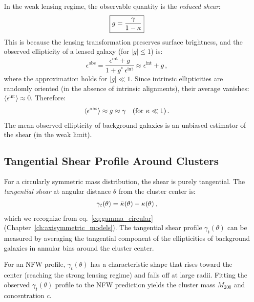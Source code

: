 In the weak lensing regime, the observable quantity is the
\emph{reduced shear}:
\begin{equation}
    \boxed{
    g = \frac{\gamma}{1 - \kappa}
    }
    \label{eq:reduced_shear}
\end{equation}
This is because the lensing transformation preserves surface
brightness, and the observed ellipticity of a lensed galaxy (for
$|g| \leq 1$) is:
\begin{equation}
    \epsilon^{\mathrm{obs}} = \frac{\epsilon^{\mathrm{int}} + g}
    {1 + g^*\, \epsilon^{\mathrm{int}}}
    \approx \epsilon^{\mathrm{int}} + g \,,
    \label{eq:observed_ellipticity}
\end{equation}
where the approximation holds for $|g| \ll 1$.  Since intrinsic
ellipticities are randomly oriented (in the absence of intrinsic
alignments), their average vanishes:
$\langle\epsilon^{\mathrm{int}}\rangle \approx 0$.  Therefore:
\begin{equation}
    \langle \epsilon^{\mathrm{obs}} \rangle \approx g
    \approx \gamma \quad (\text{for } \kappa \ll 1) \,.
    \label{eq:shear_estimator}
\end{equation}
The mean observed ellipticity of background galaxies is an unbiased
estimator of the shear (in the weak limit).

\subsection{Tangential Shear Profile Around Clusters}

For a circularly symmetric mass distribution, the shear is purely
tangential.  The \emph{tangential shear} at angular distance
$\theta$ from the cluster center is:
\begin{equation}
    \gamma_t(\theta) = \bar{\kappa}(\theta) - \kappa(\theta) \,,
    \label{eq:tangential_shear}
\end{equation}
which we recognize from eq.~\eqref{eq:gamma_circular}
(Chapter~\ref{ch:axisymmetric_models}).  The tangential shear profile
$\gamma_t(\theta)$ can be measured by averaging the tangential
component of the ellipticities of background galaxies in annular
bins around the cluster center.

For an NFW profile, $\gamma_t(\theta)$ has a characteristic shape
that rises toward the center (reaching the strong lensing regime) and
falls off at large radii.  Fitting the observed $\gamma_t(\theta)$
profile to the NFW prediction yields the cluster mass $M_{200}$ and
concentration $c$.

